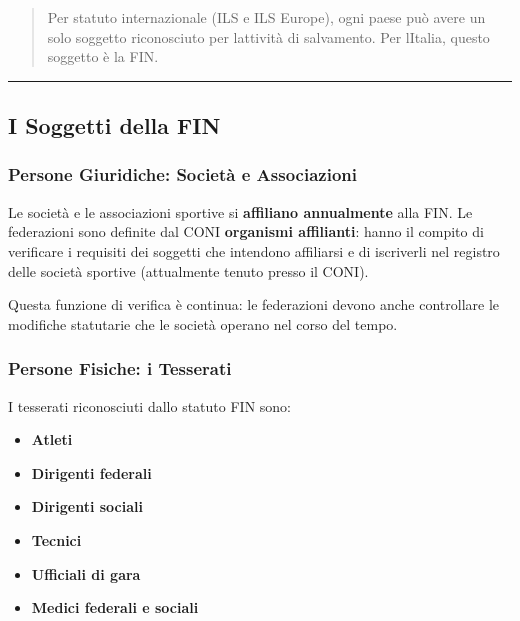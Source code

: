 \documentclass[a4paper,11pt]{article}
\providecommand{\tightlist}{%
  \setlength{\itemsep}{0pt}\setlength{\parskip}{0pt}}
\begin{document}
\begin{quote}
      Per statuto internazionale (ILS e ILS Europe), ogni paese può avere un
      solo soggetto riconosciuto per l\textquotesingle attività di salvamento.
      Per l\textquotesingle Italia, questo soggetto è la FIN.
\end{quote}

\begin{center}\rule{0.5\linewidth}{0.5pt}\end{center}

\subsection{I Soggetti della FIN}\label{i-soggetti-della-fin}

\subsubsection{Persone Giuridiche: Società e
      Associazioni}\label{persone-giuridiche-societuxe0-e-associazioni}

Le società e le associazioni sportive si \textbf{affiliano annualmente}
alla FIN. Le federazioni sono definite dal CONI \textbf{organismi
      affilianti}: hanno il compito di verificare i requisiti dei soggetti che
intendono affiliarsi e di iscriverli nel registro delle società sportive
(attualmente tenuto presso il CONI).

Questa funzione di verifica è continua: le federazioni devono anche
controllare le modifiche statutarie che le società operano nel corso del
tempo.

\subsubsection{Persone Fisiche: i
      Tesserati}\label{persone-fisiche-i-tesserati}

I tesserati riconosciuti dallo statuto FIN sono:

\begin{itemize}
      \tightlist
      \item
            \textbf{Atleti}
      \item
            \textbf{Dirigenti federali}
      \item
            \textbf{Dirigenti sociali}
      \item
            \textbf{Tecnici}
      \item
            \textbf{Ufficiali di gara}
      \item
            \textbf{Medici federali e sociali}
\end{itemize}
\end{document}
